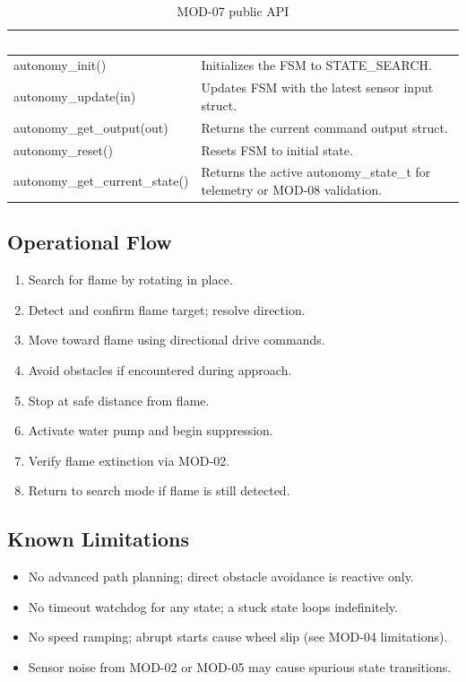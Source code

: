 \documentclass[12pt,a4paper]{article}
\newcommand{\theadtext}[1]{\textcolor{white}{\textbf{#1}}}
\newcommand{\fn}[1]{{\footnotesize\ttfamily #1}}
\begin{document}
\begin{table}[H]
\centering\small
\begin{tabularx}{\textwidth}{L{5cm} X}
\toprule
{}
\theadtext{Function} & \theadtext{Description} \\
\midrule
{}   \fn{autonomy\_init()}              & Initializes the FSM to \fn{STATE\_SEARCH}. \\
 \fn{autonomy\_update(in)}          & Updates FSM with the latest sensor input struct. \\
   \fn{autonomy\_get\_output(out)}    & Returns the current command output struct. \\
 \fn{autonomy\_reset()}             & Resets FSM to initial state. \\
   \fn{autonomy\_get\_current\_state()} & Returns the active \fn{autonomy\_state\_t} for telemetry or MOD-08 validation. \\
\bottomrule
\end{tabularx}
\caption{MOD-07 public API}
\end{table}

\subsection{Operational Flow}

\begin{enumerate}[leftmargin=1.5em]
  \item Search for flame by rotating in place.
  \item Detect and confirm flame target; resolve direction.
  \item Move toward flame using directional drive commands.
  \item Avoid obstacles if encountered during approach.
  \item Stop at safe distance from flame.
  \item Activate water pump and begin suppression.
  \item Verify flame extinction via MOD-02.
  \item Return to search mode if flame is still detected.
\end{enumerate}

\subsection{Known Limitations}

\begin{itemize}[leftmargin=1.5em]
  \item No advanced path planning; direct obstacle avoidance is reactive only.
  \item No timeout watchdog for any state; a stuck state loops indefinitely.
  \item No speed ramping; abrupt starts cause wheel slip (see MOD-04 limitations).
  \item Sensor noise from MOD-02 or MOD-05 may cause spurious state transitions.
\end{itemize}
\end{document}
